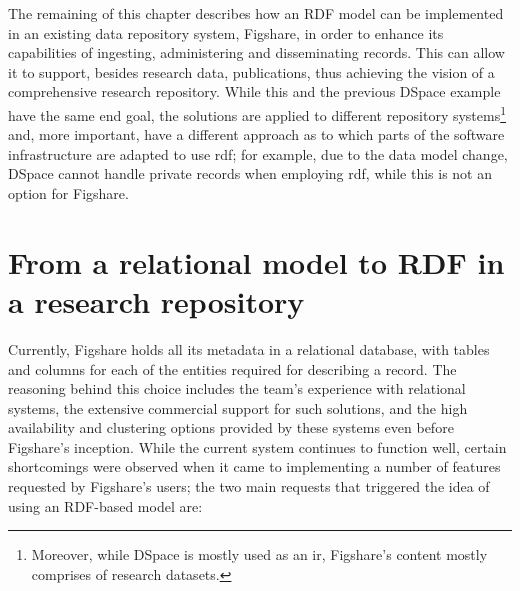 The remaining of this chapter describes how an RDF model can be implemented in an existing data repository system, Figshare, in order to enhance its capabilities of ingesting, administering and disseminating records. This can allow it to support, besides research data, publications, thus achieving the vision of a comprehensive research repository. While this and the previous DSpace example have the same end goal, the solutions are applied to different repository systems\footnote{Moreover, while DSpace is mostly used as an \gls{ir}, Figshare's content mostly comprises of research datasets.} and, more important, have a different approach as to which parts of the software infrastructure are adapted to use \gls{rdf}; for example, due to the data model change, DSpace cannot handle private records when employing \gls{rdf}, while this is not an option for Figshare.

\newpage

\section{From a relational model to RDF in a research repository}
\label{sec:tordf}

Currently, Figshare holds all its metadata in a relational database, with tables and columns for each of the entities required for describing a record. The reasoning behind this choice includes the team's experience with relational systems, the extensive commercial support for such solutions, and the high availability and clustering options provided by these systems even before Figshare's inception. While the current system continues to function well, certain shortcomings were observed when it came to implementing a number of features requested by Figshare's users; the two main requests that triggered the idea of using an RDF-based model are:

